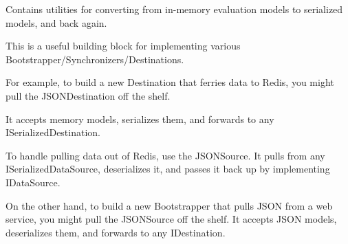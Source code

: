 Contains utilities for converting from in-\/memory evaluation models to serialized models, and back again.

This is a useful building block for implementing various Bootstrapper/\+Synchronizers/\+Destinations.

For example, to build a new Destination that ferries data to Redis, you might pull the {\ttfamily JSONDestination} off the shelf.

It accepts memory models, serializes them, and forwards to any {\ttfamily ISerialized\+Destination}.


\begin{DoxyCode}{0}

\end{DoxyCode}


To handle pulling data out of Redis, use the {\ttfamily JSONSource}. It pulls from any {\ttfamily ISerialized\+Data\+Source}, deserializes it, and passes it back up by implementing {\ttfamily IData\+Source}.


\begin{DoxyCode}{0}

\end{DoxyCode}


On the other hand, to build a new Bootstrapper that pulls JSON from a web service, you might pull the {\ttfamily JSONSource} off the shelf. It accepts JSON models, deserializes them, and forwards to any {\ttfamily IDestination}.


\begin{DoxyCode}{0}

\end{DoxyCode}
 